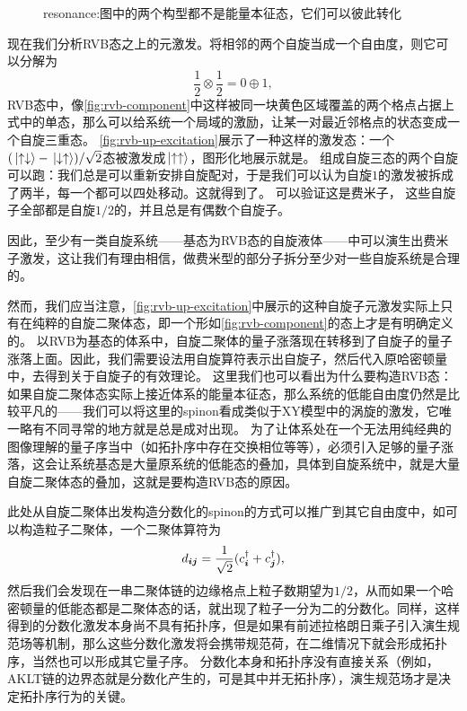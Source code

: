 \begin{figure}
    \centering
    
    \caption{resonance:图中的两个构型都不是能量本征态，它们可以彼此转化}
    \label{fig:rvb-resonance}
\end{figure}

现在我们分析RVB态之上的元激发。将相邻的两个自旋当成一个自由度，则它可以分解为
\begin{equation}
    \frac{1}{2} \otimes \frac{1}{2} = 0 \oplus 1,
\end{equation}
RVB态中，像\autoref{fig:rvb-component}中这样被同一块黄色区域覆盖的两个格点占据上式中的单态，那么可以给系统一个局域的激励，让某一对最近邻格点的状态变成一个自旋三重态。
\autoref{fig:rvb-up-excitation}展示了一种这样的激发态：一个$(\ket*{\uparrow \downarrow} - \ket*{\downarrow \uparrow}) / \sqrt{2}$态被激发成$\ket*{\uparrow \uparrow}$，图形化地展示就是。
组成自旋三态的两个自旋可以跑：我们总是可以重新安排自旋配对，于是我们可以认为自旋$1$的激发被拆成了两半，每一个都可以四处移动。这就得到了。
可以验证这是费米子，%
这些自旋子全部都是自旋$1/2$的，并且总是有偶数个自旋子。

因此，至少有一类自旋系统——基态为RVB态的自旋液体——中可以演生出费米子激发，这让我们有理由相信，做费米型的部分子拆分至少对一些自旋系统是合理的。

然而，我们应当注意，\autoref{fig:rvb-up-excitation}中展示的这种自旋子元激发实际上只有在纯粹的自旋二聚体态，即一个形如\autoref{fig:rvb-component}的态上才是有明确定义的。
以RVB为基态的体系中，自旋二聚体的量子涨落现在转移到了自旋子的量子涨落上面。因此，我们需要设法用自旋算符表示出自旋子，然后代入原哈密顿量中，去得到关于自旋子的有效理论。
这里我们也可以看出为什么要构造RVB态：如果自旋二聚体态实际上接近体系的能量本征态，那么系统的低能自由度仍然是比较平凡的——我们可以将这里的spinon看成类似于XY模型中的涡旋的激发，它唯一略有不同寻常的地方就是总是成对出现。
为了让体系处在一个无法用纯经典的图像理解的量子序当中（如拓扑序中存在交换相位等等），必须引入足够的量子涨落，这会让系统基态是大量原系统的低能态的叠加，具体到自旋系统中，就是大量自旋二聚体态的叠加，这就是要构造RVB态的原因。

此处从自旋二聚体出发构造分数化的spinon的方式可以推广到其它自由度中，如可以构造粒子二聚体，一个二聚体算符为
\begin{equation}
    d_{\vb*{i} \vb*{j}} = \frac{1}{\sqrt{2}} (c^\dagger_{\vb*{i}} + c^\dagger_{\vb*{j}}),
\end{equation}
然后我们会发现在一串二聚体链的边缘格点上粒子数期望为$1/2$，从而如果一个哈密顿量的低能态都是二聚体态的话，就出现了粒子一分为二的分数化。同样，这样得到的分数化激发本身尚不具有拓扑序，但是如果有前述拉格朗日乘子引入演生规范场等机制，那么这些分数化激发将会携带规范荷，在二维情况下就会形成拓扑序，当然也可以形成其它量子序。
分数化本身和拓扑序没有直接关系（例如，AKLT链的边界态就是分数化产生的，可是其中并无拓扑序），演生规范场才是决定拓扑序行为的关键。

